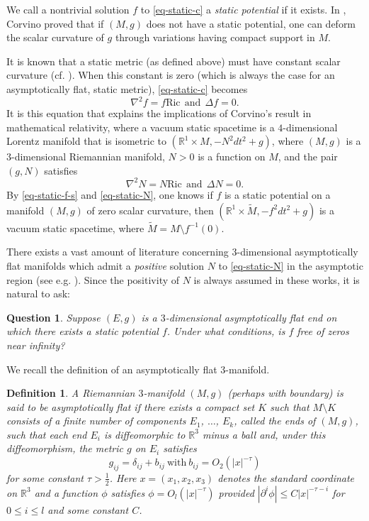 \documentclass[12pt]{amsart}
\newtheorem{ques}{Question}
\newtheorem{definition}{Definition}
\theoremstyle{remark}
\numberwithin{equation}{section}
\newcommand{\Ric}{\mbox{Ric}}
\newcommand{\R}{\mathbb R}
\newcommand{\be}{\begin{equation}}
\newcommand{\ee}{\end{equation}}
\def\p{\partial}
\begin{document}
We call   a nontrivial solution $f$ to \eqref{eq-static-c}   a {\it static potential} if it exists.
In \cite[Theorem 1]{Corvino}, Corvino proved that   if $(M, g)$ does not have a static potential,
one can deform the scalar curvature of $g$  through variations  having compact support in $M$.

It is known that a static metric  (as defined above) must have  constant scalar curvature (cf. \cite[Proposition 2.3]{Corvino}).
When this  constant   is zero (which is always the case for an asymptotically flat,  static metric),
 \eqref{eq-static-c}  becomes
\be \label{eq-static-f-s}
\nabla^2 f   = f \Ric
\  \ \mathrm{and} \ \ \Delta f  =  0 .
\ee
It is this  equation that explains the implications of Corvino's result  in   mathematical relativity,
where  a  vacuum static spacetime is  a $4$-dimensional Lorentz manifold that is isometric to
$ ( \R^1 \times M, - N^2 d t^2 + g ) $,
where $(M, g)$ is a $3$-dimensional Riemannian manifold,
$N  > 0 $ is a function on $M$, and the pair $(g, N)$
 satisfies
\be \label{eq-static-N}
\nabla^2 N = N \Ric  \ \ \mathrm{and} \ \
\Delta N = 0.
\ee
By \eqref{eq-static-f-s} and \eqref{eq-static-N}, one knows
if  $f$ is a static potential on a  manifold $(M, g)$ of  zero  scalar curvature,
  then  $( \R^1 \times \tilde{M},  - f^2 d t^2 + g )$
is a vacuum static spacetime, where $\tilde{M} = M \setminus f^{-1}(0) $.

There exists   a vast amount of literature concerning $3$-dimensional asymptotically flat  manifolds which
admit a {\em positive}  solution $N$ to \eqref{eq-static-N}  in the asymptotic region
(see  e.g. \cite{Bunting-Masood, Chrusciel98, Anderson,  Miao05, Beig-Schoen, C-G10, M-M13}).
Since the positivity of $N$ is always assumed  in these works,  it is natural to ask:

\begin{ques} \label{ques-main}
 Suppose $(E, g)$ is a $3$-dimensional asymptotically flat end on which there exists a static potential $f$.
 Under what conditions, is  $f$ free of zeros near infinity?
 \end{ques}

We recall the definition  of  an asymptotically flat $3$-manifold.

\begin{definition} \label{def-def-AF}
A Riemannian $3$-manifold $(M, g)$ (perhaps with boundary) is said to be  {asymptotically flat} if
there exists a   compact set $K$ such that  $ M \setminus K$ consists of
a finite number of components  $E_1$, $\ldots$, $E_k$,  called  the ends of $(M, g)$,
 such that each end $E_i$ is
diffeomorphic to $ \R^3 $ minus a ball  and,
under this diffeomorphism,
the metric $g$ on $E_i$  satisfies
\be \label{eq-AF-def-intro}
g_{ij}=\delta_{ij}+b_{ij} \mathrm{ \  with \ }
b_{ij} = O_2 ( | x|^{-\tau} )
\ee
for some constant $\tau>\frac12$. Here $x=( x_1, x_2, x_3 )$ denotes  the standard coordinate on $ \R^3$
and a function $\phi$ satisfies  $ \phi  = O_l ( | x|^{-\tau} )$ provided   $ | \p^i \phi | \le C |x|^{-\tau - i }$ for $ 0 \le i \le l $ and some constant $C$.
\end{definition}
\end{document}

